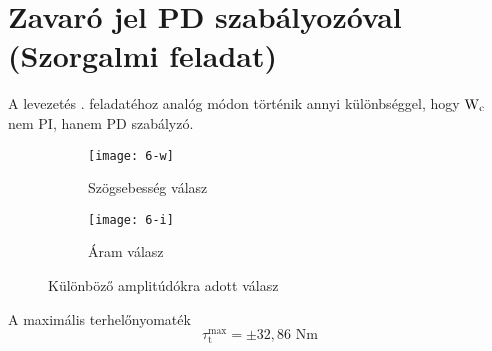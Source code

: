 \section{Zavaró jel PD szabályozóval (Szorgalmi feladat)}

A levezetés . feladatéhoz analóg módon történik annyi különbséggel, hogy
$\mathrm{W}_\text{c}$ nem PI, hanem PD szabályzó.

\begin{figure}[H]
	\centering
	\begin{subfigure}{.49\textwidth}
		\texttt{[image: 6-w]}
		\caption{Szögsebesség válasz}
	\end{subfigure}
	\begin{subfigure}{.49\textwidth}
		\texttt{[image: 6-i]}
		\caption{Áram válasz}
	\end{subfigure}
	\caption{Különböző amplitúdókra adott válasz}
	\label{fig:szorg2}
\end{figure}

A maximális terhelőnyomaték
\begin{equation}
	\tau_\text{t}^\text{max} = \pm32,86\text{ Nm}
\end{equation}
